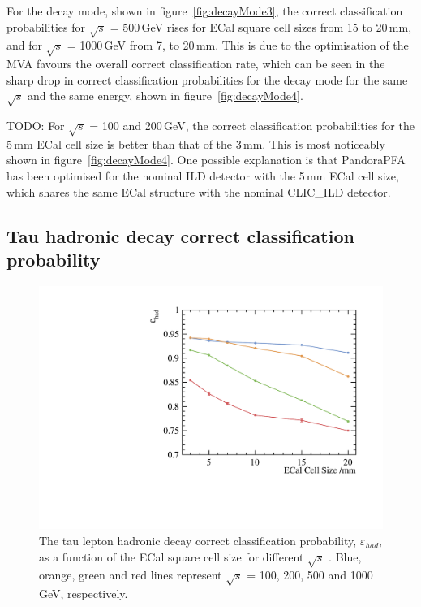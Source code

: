 \documentclass[a4paper,11pt]{article}
\newcommand{\decayRho}{\PGrP{\PGpm\PGpz}\PGnGt}
\newcommand{\decayAiPhoton}{\PaDoP{\PGpm\PGpz\PGpz}\PGnGt}
\newcommand{\rootS}{\ensuremath{\sqrt{s}} }
\begin{document}
For the \decayRho decay mode, shown in figure~\ref{fig:decayMode3}, the correct classification probabilities for \rootS = 500\,GeV rises for ECal square cell sizes from 15 to 20\,mm, and for  \rootS = 1000\,GeV from 7, to 20\,mm. This is due to the optimisation of the MVA favours the overall correct classification rate, which can be seen in the sharp drop in correct classification probabilities for the \decayAiPhoton decay mode for the same \rootS and the same energy, shown in figure~\ref{fig:decayMode4}. 

TODO:
For \rootS = 100 and 200\,GeV, the correct classification probabilities for the 5\,mm ECal cell size is better than that of the 3\,mm. This is most noticeably shown in figure~\ref{fig:decayMode4}. One possible explanation is that PandoraPFA has been optimised for the nominal ILD detector with the 5\,mm ECal cell size, which shares the same ECal structure with the nominal CLIC\_ILD detector.




\subsection{Tau hadronic decay correct classification probability}

\begin{figure}[htbp]
\centering %
\includegraphics[width=.45\textwidth]{plots3/hadronicEff}
\caption{\label{fig:hadronic_efficiency} The tau lepton hadronic decay correct classification probability, $\varepsilon_{had}$, as a function of the ECal square cell size for different \rootS. Blue, orange, green and red lines represent \rootS = 100, 200, 500 and 1000\,GeV, respectively.}
\end{figure}
\end{document}
